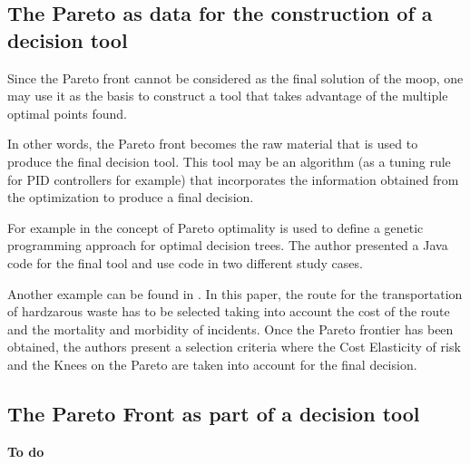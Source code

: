 \subsection{The Pareto as data for the construction of a decision tool}
\label{sec:ParetoData}
%
Since the Pareto front cannot be considered as the final solution of the \gls{moop}, one may use it as the basis to construct a tool that takes advantage of the multiple optimal points found.

In other words, the Pareto front becomes the raw material that is used to produce the final decision tool. This tool may be an algorithm (as a tuning rule for PID controllers for example) that incorporates the information obtained from the optimization to produce a final decision.

For example in \cite{Zhao2007}	the concept of Pareto optimality is used to define a genetic programming approach for optimal decision trees. The author presented a Java code for the final tool and use code in two different study cases.

Another example can be found in \cite{Das2012}. In this paper, the route for the transportation of hardzarous waste has to be selected taking into account the cost of the route and the mortality and morbidity of incidents. Once the Pareto frontier has been obtained, the authors present a selection criteria where the Cost Elasticity of risk and the Knees on the Pareto are taken into account for the final decision.



\subsection{The Pareto Front as part of a decision tool}
\label{sec:ParetoDecision}
\textbf{To do}




